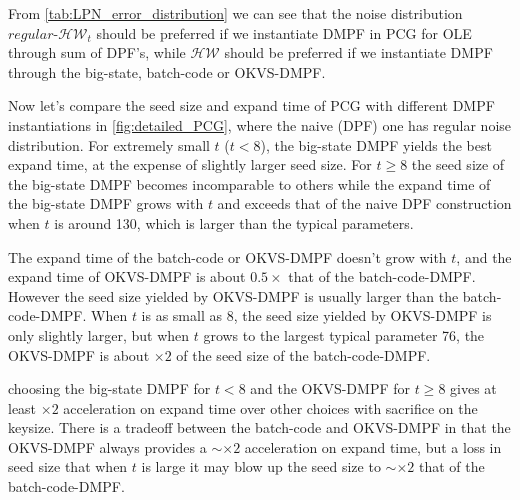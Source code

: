 
From \cref{tab:LPN_error_distribution} we can see that the noise distribution $regular$-$\mathcal{HW}_t$ should be preferred if we instantiate DMPF in PCG for OLE through sum of DPF's, while $\mathcal{HW}$ should be preferred if we instantiate DMPF through the big-state, batch-code or OKVS-DMPF. 

Now let's compare the seed size and expand time of PCG with different DMPF instantiations in \cref{fig:detailed_PCG}, where the naive (DPF) one has regular noise distribution. For extremely small $t$ ($t<8$), the big-state DMPF yields the best expand time, at the expense of slightly larger seed size. For $t\ge 8$ the seed size of the big-state DMPF becomes incomparable to others while the expand time of the big-state DMPF grows with $t$ and exceeds that of the naive DPF construction when $t$ is around 130, which is larger than the typical parameters. 

The expand time of the batch-code or OKVS-DMPF doesn't grow with $t$, and the expand time of OKVS-DMPF is about $0.5\times $ that of the batch-code-DMPF. However the seed size yielded by OKVS-DMPF is usually larger than the batch-code-DMPF. When $t$ is as small as 8, the seed size yielded by OKVS-DMPF is only slightly larger, but when $t$ grows to the largest typical parameter 76, the OKVS-DMPF is about $\times 2$ of the seed size of the batch-code-DMPF. 



 choosing the big-state DMPF for $t<8$ and the OKVS-DMPF for $t\ge 8$ gives at least $\times 2$ acceleration on expand time over other choices with sacrifice on the keysize. There is a tradeoff between the batch-code and OKVS-DMPF in that the OKVS-DMPF always provides a $\sim\times 2$ acceleration on expand time, but a loss in seed size that when $t$ is large it may blow up the seed size to $\sim \times 2$ that of the batch-code-DMPF. 

